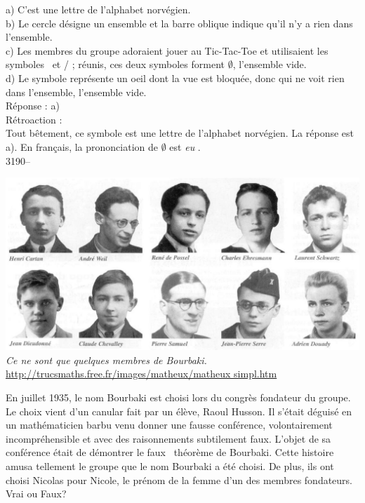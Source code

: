 \documentclass[letterpaper, 12pt]{article}
\begin{document}
a) C'est une lettre de l'alphabet norv\'egien.\\
b) Le cercle d\'esigne un ensemble et la barre oblique indique qu'il n'y a rien dans l'ensemble.\\
c) Les membres du groupe adoraient jouer au Tic-Tac-Toe et utilisaient les symboles  \fg \ et \og / \fg; r\'eunis, ces deux symboles forment $\emptyset$, l'ensemble vide.\\
d) Le symbole repr\'esente un oeil dont la vue est bloqu\'ee, donc qui ne voit rien dans l'ensemble, l'ensemble vide.\\

R\'eponse : a)\\

R\'etroaction :\\
Tout b\^etement, ce symbole est une lettre de l'alphabet norv\'egien. La r\'eponse est a). En fran\c cais, la prononciation de $\emptyset$ est \og \emph{eu} \fg.\\



3190--
\begin{center}
\includegraphics[scale=0.25]{bourbaki.eps}\\
\emph{{\small Ce ne sont que quelques membres de Bourbaki.}}\\
\href{http://trucsmaths.free.fr/images/matheux/matheux_simpl.htm#B}{http://trucsmaths.free.fr/images/matheux/matheux simpl.htm}\\
\end{center}
En juillet 1935, le nom Bourbaki est choisi lors du congr\`es fondateur du groupe. Le choix vient d'un canular fait par un \'el\`eve, Raoul Husson. Il s'\'etait d\'eguis\'e en un math\'ematicien barbu venu donner une fausse conf\'erence, volontairement incompr\'ehensible et avec des raisonnements subtilement faux. L'objet de sa conf\'erence \'etait de d\'emontrer le \og faux \fg \ th\'eor\`eme de Bourbaki. Cette histoire amusa tellement le groupe que le nom Bourbaki a \'et\'e choisi. De plus, ils ont choisi Nicolas pour Nicole, le pr\'enom de la femme d'un des membres fondateurs.\\
Vrai ou Faux?\\
\end{document}
